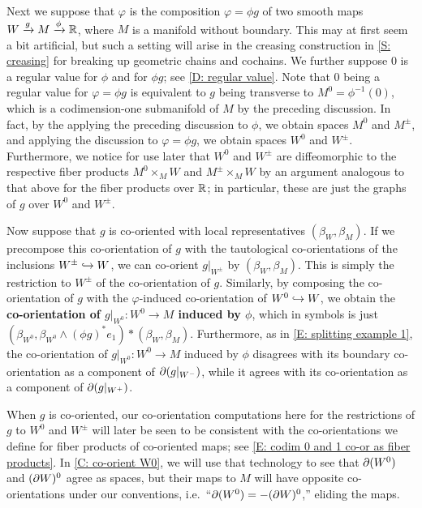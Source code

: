 \begin{example}
	Next we suppose that $\varphi$ is the composition $\varphi = \phi g$ of two smooth maps $W \xrightarrow{g} M \xrightarrow{\phi}\mathbb{R}$, where $M$ is a manifold without boundary.
	This may at first seem a bit artificial, but such a setting will arise in the creasing construction in \cref{S: creasing} for breaking up geometric chains and cochains.
	We further suppose $0$ is a regular value for $\phi$ and for $\phi g$; see \cref{D: regular value}.
	Note that $0$ being a regular value for $\varphi = \phi g$ is equivalent to $g$ being transverse to $M^0 = \phi^{-1}(0)$, which is a codimension-one submanifold of $M$ by the preceding discussion.
	In fact, by the applying the preceding discussion to $\phi$, we obtain spaces $M^0$ and $M^\pm$, and applying the discussion to $\varphi = \phi g$, we obtain spaces $W^0$ and $W^\pm$.
	Furthermore, we notice for use later that $W^0$ and $W^\pm$ are diffeomorphic to the respective fiber products $M^0 \times_M W$ and $M^{\pm} \times_M W$ by an argument analogous to that above for the fiber products over $\mathbb{R}$; in particular, these are just the graphs of $g$ over $W^0$ and $W^\pm$.


	Now suppose that $g$ is co-oriented with local representatives $(\beta_W, \beta_M)$.
	If we precompose this co-orientation of $g$ with the tautological co-orientations of the inclusions $W^\pm \hookrightarrow W$, we can co-orient $g|_{W^\pm}$ by $(\beta_W, \beta_M)$.
	This is simply the restriction to $W^\pm$ of the co-orientation of $g$.
	Similarly, by composing the co-orientation of $g$ with the $\varphi$-induced co-orientation of $W^0 \hookrightarrow W$, we obtain the \textbf{co-orientation of $g|_{W^0} \colon W^0 \to M$ induced by $\phi$}, which in symbols is just $(\beta_{W^0}, \beta_{W^0} \wedge (\phi g)^*e_1)*(\beta_W,\beta_M)$.
	Furthermore, as in \cref{E: splitting example 1}, the co-orientation of $g|_{W^0} \colon W^0 \to M$ induced by $\phi$ disagrees with its boundary co-orientation as a component of $\partial(g|_{W^-})$, while it agrees with its co-orientation as a component of $\partial(g|_{W^+})$.

	When $g$ is co-oriented, our co-orientation computations here for the restrictions of $g$ to $W^0$ and $W^\pm$ will later be seen to be consistent with the co-orientations we define for fiber products of co-oriented maps; see \cref{E: codim 0 and 1 co-or as fiber products}.
	In \cref{C: co-orient W0}, we will use that technology to see that $\partial (W^0)$ and $(\partial W)^0$ agree as spaces, but their maps to $M$ will have opposite co-orientations under our conventions, i.e.\ ``$\partial (W^0) = -(\partial W)^0$,'' eliding the maps.
\end{example}

